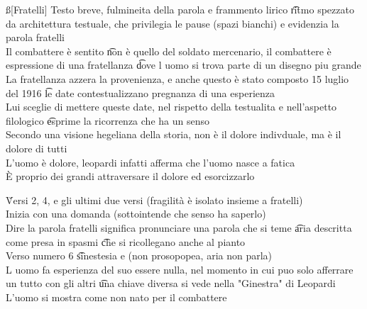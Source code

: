 \documentclass[12pt]{article}
\begin{document}
\ss[Fratelli]
Testo breve, fulmineita della parola e frammento lirico \t ritmo spezzato da architettura testuale, che privilegia le pause (spazi bianchi) e evidenzia la parola fratelli \\
Il combattere è sentito \t non è quello del soldato mercenario, il combattere è espressione di una fratellanza \t dove l uomo si trova parte di un disegno piu grande \\
La fratellanza azzera la provenienza, e anche questo è stato composto 15 luglio del 1916 \t le date contestualizzano pregnanza di una esperienza \\
Lui sceglie di mettere queste date, nel rispetto della testualita e nell'aspetto filologico \t esprime la ricorrenza che ha un senso \\
Secondo una visione hegeliana della storia, non è il dolore indivduale, ma è il dolore di tutti \\
L'uomo è dolore, leopardi infatti afferma che l'uomo nasce a fatica \\
È proprio dei grandi attraversare il dolore ed esorcizzarlo

\v

Versi 2, 4, e gli ultimi due versi (fragilità è isolato insieme a fratelli) \\
Inizia con una domanda (sottointende che senso ha saperlo) \\
Dire la parola fratelli significa pronunciare una parola che si teme \t aria descritta come presa in spasmi \t che si ricollegano anche al pianto \\
Verso numero 6 \t sinestesia e (non prosopopea, aria non parla) \\
L uomo fa esperienza del suo essere nulla, nel momento in cui puo solo afferrare un tutto con gli altri \t una chiave diversa si vede nella "Ginestra" di Leopardi \\
L'uomo si mostra come non nato per il combattere \\
\end{document}
